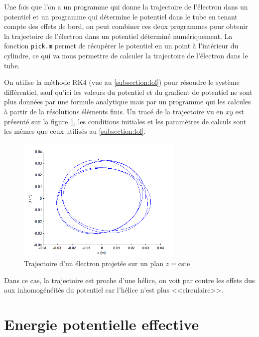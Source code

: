 \documentclass[a4paper,12pt]{article}
\begin{document}
Une fois que l'on a un programme qui donne la trajectoire de l'électron dans un potentiel et un programme qui détermine le potentiel dans le tube en tenant compte des effets de bord, on peut combiner ces deux programmes pour obtenir la trajectoire de l'électron dans un potentiel déterminé numériquement. La fonction \verb|pick.m| permet de récupérer le potentiel en un point à l'intérieur du cylindre, ce qui va nous permettre de calculer la trajectoire de l'électron dans le tube.

On utilise la méthode RK4 (vue au \ref{subsection:lol}) pour résoudre le système différentiel, sauf qu'ici les valeurs du potentiel et du gradient de potentiel ne sont plus données par une formule analytique mais par un programme qui les calcules à partir de la résolutions éléments finis. Un tracé de la trajectoire vu en $xy$ est présenté sur la figure \ref{fig:elie_encule}, les conditions initiales et les paramètres de calculs sont les mêmes que ceux utilisés au \ref{subsection:lol}.

\begin{figure}[h]
\centering
\includegraphics[height=6cm]{images/t_num_xy.png}
\caption{Trajectoire d'un électron projetée sur un plan $z=\mathrm{cste}$}
\label{fig:elie_encule}
\end{figure}

Dans ce cas, la trajectoire est proche d'une hélice, on voit par contre les effets dus aux inhomogénéités du potentiel car l'hélice n'est plus <<circulaire>>.



\section{Energie potentielle effective}
\end{document}
